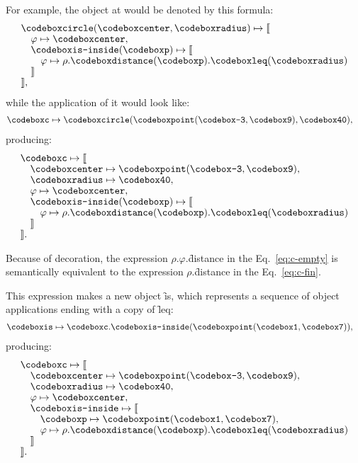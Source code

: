 For example, the object at  would
be denoted by this formula:
\begin{equation}\label{eq:c-empty}
\begin{split}
& \f{circle}(\f{center}, \f{radius}) \mapsto \llbracket \br
& \quad \varphi \mapsto \f{center}, \br
& \quad \f{is-inside}(\f{p}) \mapsto \llbracket \br
& \quad \quad \varphi \mapsto \rho.\f{distance}(\f{p}).\f{leq}(\f{radius}) \br
& \quad \rrbracket \br
& \rrbracket,
\end{split}
\end{equation}
while the application of it would look like:
\begin{equation}
\begin{split}
\f{c} & \mapsto \f{circle}(\f{point}(\f{-3}, \f{9}), \f{40}),
\end{split}
\end{equation}
producing:
\begin{equation}\label{eq:c-fin}
\begin{split}
& \f{c} \mapsto \llbracket \br
& \quad \f{center} \mapsto \f{point}(\f{-3}, \f{9}), \br
& \quad \f{radius} \mapsto \f{40}, \br
& \quad \varphi \mapsto \f{center}, \br
& \quad \f{is-inside}(\f{p}) \mapsto \llbracket \br
& \quad \quad \varphi \mapsto \rho.\f{distance}(\f{p}).\f{leq}(\f{radius}) \br
& \quad \rrbracket \br
& \rrbracket.
\end{split}
\end{equation}

Because of decoration, the expression
$\rho$.$\varphi$.\f{distance} in the Eq.~\ref{eq:c-empty} is semantically equivalent to the expression
$\rho$.\f{distance} in the Eq.~\ref{eq:c-fin}.

This expression makes a new object \f{is}, which represents
a sequence of object applications ending with a copy of \f{leq}:
\begin{equation}\label{eq:is}
\begin{split}
& \f{is} \mapsto \f{c}.\f{is-inside}(\f{point}(\f{1}, \f{7})),
\end{split}
\end{equation}
producing:
\begin{equation}\label{eq:c-fin2}
\begin{split}
& \f{c} \mapsto \llbracket \br
& \quad \f{center} \mapsto \f{point}(\f{-3}, \f{9}), \br
& \quad \f{radius} \mapsto \f{40}, \br
& \quad \varphi \mapsto \f{center}, \br
& \quad \f{is-inside} \mapsto \llbracket \br
& \quad \quad \f{p} \mapsto \f{point}(\f{1}, \f{7}), \br
& \quad \quad \varphi \mapsto \rho.\f{distance}(\f{p}).\f{leq}(\f{radius}) \br
& \quad \rrbracket \br
& \rrbracket.
\end{split}
\end{equation}

